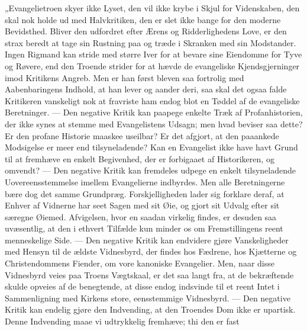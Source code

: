 \documentclass[12pt,a4paper]{book}
\begin{document}
„Evangelietroen skyer ikke Lyset, den vil ikke krybe i Skjul for Videnskaben, den
skal nok holde ud med Halvkritiken, den er slet ikke bange for den moderne
Bevidsthed. Bliver den
udfordret efter Ærens og Ridderlighedens Love, er den strax beredt at tage sin
Rustning paa og træde i Skranken med sin Modstander. Ingen Rigmand kan stride med
større Iver for at bevare sine Eiendomme for Tyve og Røvere, end den Troende strider
for at hævde de evangeliske Kjendsgjerninger imod Kritikens Angreb. Men er han først
bleven saa fortrolig med Aabenbaringens Indhold, at han lever og aander deri, saa
skal det ogsaa falde Kritikeren vanskeligt nok at fravriste ham endog blot en Tøddel
af de evangeliske Beretninger. --- Den negative Kritik kan paapege enkelte Træk af
Profanhistorien, der ikke synes at stemme med Evangelistens Udsagn; men hvad beviser
saa dette? Er den profane Historie maaskee useilbar? Er det afgjort, at den paaankede
Modsigelse er meer end tilsyneladende? Kan en Evangelist ikke have havt Grund til at
fremhæve en enkelt Begivenhed, der er forbigaaet af Historikeren, og omvendt? --- Den
negative Kritik kan fremdeles udpege en enkelt tilsyneladende Uovereensstemmelse
imellem Evangelierne indbyrdes. Men alle Beretningerne bære dog det samme Grundpræg.
Forskjelligheden lader sig forklare deraf, at Enhver af Vidnerne har seet Sagen med
sit Øie, og gjort sit Udvalg efter sit særegne Øiemed. Afvigelsen, hvor en saadan
virkelig findes, er desuden saa uvæsentlig, at den i ethvert Tilfælde kun minder os om
Fremstillingens reent menneskelige Side. --- Den negative Kritik kan endvidere gjøre
Vanskeligheder med Hensyn til de ældste Vidnesbyrd, der findes hos Fædrene, hos
Kjætterne og Christendommens Fiender, om vore kanoniske Evangelier. Men, naar disse
Vidnesbyrd veies paa Troens Vægtskaal, er det saa langt fra, at de bekræftende skulde
opveies af de benegtende, at disse endog indsvinde til et reent Intet i Sammenligning
med Kirkens store, eensstemmige Vidnesbyrd. --- Den negative Kritik kan endelig gjøre
den Indvending, at den Troendes
Dom ikke er upartisk. Denne Indvending maae vi udtrykkelig fremhæve; thi den er fast
\end{document}
